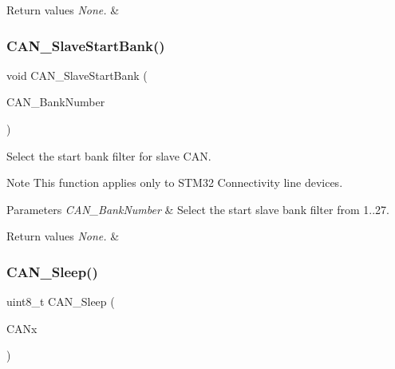 \begin{DoxyRetVals}{Return values}
{\em None.} & \\
\hline
\end{DoxyRetVals}
\mbox{\label{group___c_a_n___private___functions_ga109ff8960bc59f44b984c9646f17b3c0}} 
\subsubsection{\texorpdfstring{CAN\_SlaveStartBank()}{CAN\_SlaveStartBank()}}
{\footnotesize\ttfamily void C\+A\+N\+\_\+\+Slave\+Start\+Bank (\begin{DoxyParamCaption}\item[{uint8\+\_\+t}]{C\+A\+N\+\_\+\+Bank\+Number }\end{DoxyParamCaption})}



Select the start bank filter for slave C\+AN. 

\begin{DoxyNote}{Note}
This function applies only to S\+T\+M32 Connectivity line devices. 
\end{DoxyNote}

\begin{DoxyParams}{Parameters}
{\em C\+A\+N\+\_\+\+Bank\+Number} & Select the start slave bank filter from 1..27. \\
\hline
\end{DoxyParams}

\begin{DoxyRetVals}{Return values}
{\em None.} & \\
\hline
\end{DoxyRetVals}
\mbox{\label{group___c_a_n___private___functions_ga640215e38765759d7eceb8a039046667}} 
\subsubsection{\texorpdfstring{CAN\_Sleep()}{CAN\_Sleep()}}
{\footnotesize\ttfamily uint8\+\_\+t C\+A\+N\+\_\+\+Sleep (\begin{DoxyParamCaption}\item[{\mbox{\hyperlink{struct_c_a_n___type_def}{C\+A\+N\+\_\+\+Type\+Def}} $\ast$}]{C\+A\+Nx }\end{DoxyParamCaption})}



